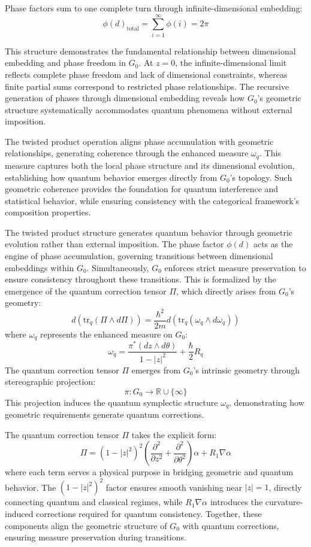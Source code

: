 \documentclass[10pt]{article}
\begin{document}
Phase factors sum to one complete turn through infinite-dimensional embedding:
\[
\phi(d)_{\text{total}} = \sum_{i=1}^{\infty} \phi(i) = 2\pi
\]

This structure demonstrates the fundamental relationship between dimensional embedding and phase freedom in $G_0$. At $z = 0$, the infinite-dimensional limit reflects complete phase freedom and lack of dimensional constraints, whereas finite partial sums correspond to restricted phase relationships. The recursive generation of phases through dimensional embedding reveals how $G_0$'s geometric structure systematically accommodates quantum phenomena without external imposition.

The twisted product operation aligns phase accumulation with geometric relationships, generating coherence through the enhanced measure $\omega_q$. This measure captures both the local phase structure and its dimensional evolution, establishing how quantum behavior emerges directly from $G_0$'s topology. Such geometric coherence provides the foundation for quantum interference and statistical behavior, while ensuring consistency with the categorical framework's composition properties.

The twisted product structure generates quantum behavior through geometric evolution rather than external imposition. The phase factor $\phi(d)$ acts as the engine of phase accumulation, governing transitions between dimensional embeddings within $G_0$. Simultaneously, $G_0$ enforces strict measure preservation to ensure consistency throughout these transitions. This is formalized by the emergence of the quantum correction tensor $\Pi$, which directly arises from $G_0$'s geometry:
\[
d(\text{tr}_q(\Pi \wedge d\Pi)) = \frac{\hbar^2}{2m}d(\text{tr}_q(\omega_q \wedge d\omega_q))
\]
where $\omega_q$ represents the enhanced measure on $G_0$:
\[
\omega_q = \frac{\pi^*(dz \wedge d\theta)}{1 - |z|^2} + \frac{\hbar}{2}R_q
\]
The quantum correction tensor $\Pi$ emerges from $G_0$'s intrinsic geometry through stereographic projection:
\[
\pi: G_0 \to \mathbb{R} \cup \{\infty\}
\]
This projection induces the quantum symplectic structure $\omega_q$, demonstrating how geometric requirements generate quantum corrections.

The quantum correction tensor $\Pi$ takes the explicit form:
\[
\Pi = (1-|z|^2)^2\left(\frac{\partial^2}{\partial z^2} + \frac{\partial^2}{\partial \theta^2}\right)\alpha + R_1\nabla\alpha
\]
where each term serves a physical purpose in bridging geometric and quantum behavior. The $(1-|z|^2)^2$ factor ensures smooth vanishing near $|z| = 1$, directly connecting quantum and classical regimes, while $R_1\nabla\alpha$ introduces the curvature-induced corrections required for quantum consistency. Together, these components align the geometric structure of $G_0$ with quantum corrections, ensuring measure preservation during transitions.
\end{document}
